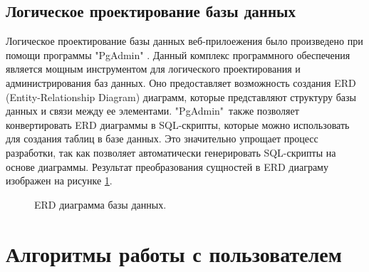 \documentclass[14pt]{extreport}
\begin{document}
    \section{Логическое проектирование базы данных}
        Логическое проектирование базы данных веб-прилоежения было произведено %
        при помощи программы "PgAdmin" \cite{pg-admin}. Данный комплекс программного обеспечения %
        является мощным инструментом для логического проектирования и %
        администрирования баз данных. Оно предоставляет возможность %
        создания ERD (Entity-Relationship Diagram) диаграмм, которые %
        представляют структуру базы данных и связи между ее элементами.
        "PgAdmin"\ также позволяет конвертировать ERD диаграммы в %
        SQL-скрипты, которые можно использовать для создания таблиц в %
        базе данных. Это значительно упрощает процесс разработки, так как %
        позволяет автоматически генерировать SQL-скрипты на основе диаграммы. %
        Результат преобразования сущностей в ERD диаграму изображен на рисунке \ref{erd_diagram}.

        \newpage
        \begin{landscape}
            \begin{figure}[H]%
                \centering
                \caption{ERD диаграмма базы данных.} \label{erd_diagram}
            \end{figure} 

        \end{landscape}

\chapter{Алгоритмы работы с пользователем}
\end{document}
